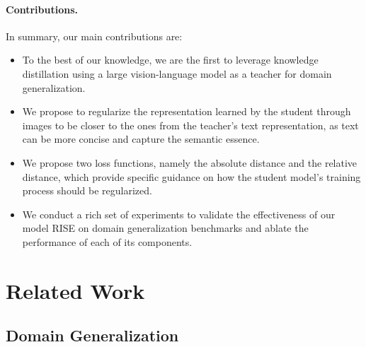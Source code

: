 \documentclass[10pt,twocolumn,letterpaper]{article}
\newcommand{\name}{{\color{black} RISE}}
\begin{document}
\paragraph{Contributions.} In summary, our main contributions are:
\begin{itemize}[noitemsep]\item To the best of our knowledge, we are the first to leverage knowledge distillation using a large vision-language model as a teacher for domain generalization. 
\item We propose to regularize the representation learned by the student through images to be closer to the ones from the teacher's text representation, as text 
    can be more concise and capture the semantic essence. 
    \item We propose two loss functions, namely the absolute distance and the relative distance, which provide specific guidance on how the student model's training process should be regularized. 
    \item We conduct a rich set of experiments to validate the effectiveness of our model \name{} on domain generalization benchmarks and ablate the performance of each of its components. 
\end{itemize}








































 \section{Related Work}
\label{sec:related}
\subsection{Domain Generalization}
\end{document}
